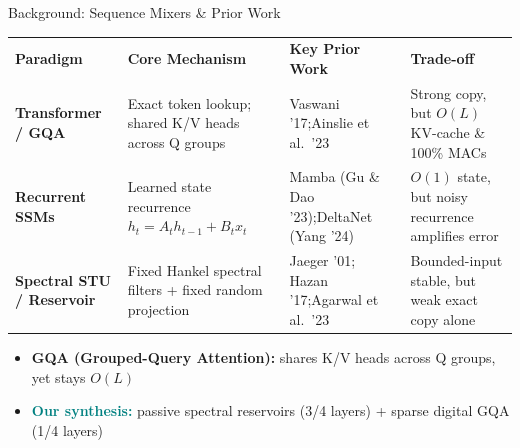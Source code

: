 \documentclass[aspectratio=169,10pt]{beamer}
\newcommand{\accentt}[1]{\textcolor{Teal}{\textbf{#1}}}
\begin{document}
\begin{frame}{Background: Sequence Mixers \& Prior Work}
  \vspace*{0.12cm}
  \begin{center}
  \footnotesize
  \setlength{\tabcolsep}{4.5pt}
  \renewcommand{\arraystretch}{1.38}
  \begin{tabular}{@{}L{2.45cm}L{3.85cm}L{3.10cm}L{3.35cm}@{}}
    \textbf{\color{Teal}Paradigm} & \textbf{\color{Teal}Core Mechanism} & \textbf{\color{Teal}Key Prior Work} & \textbf{\color{Teal}Trade-off} \\
    \midrule
    \textbf{Transformer / GQA} & Exact token lookup; shared K/V heads across Q groups & Vaswani '17;\newline Ainslie et al.\ '23 & Strong copy, but $O(L)$ KV-cache \& 100\% MACs \\
    \midrule
    \textbf{Recurrent SSMs} & Learned state recurrence $h_t = A_t h_{t-1} + B_t x_t$ & Mamba (Gu \& Dao '23);\newline DeltaNet (Yang '24) & $O(1)$ state, but noisy recurrence amplifies error \\
    \midrule
    \textbf{Spectral STU / Reservoir} & Fixed Hankel spectral filters + fixed random projection & Jaeger '01; Hazan '17;\newline Agarwal et al.\ '23 & Bounded-input stable, but weak exact copy alone \\
    \bottomrule
  \end{tabular}
  \end{center}
  \vspace*{0.32cm}
  \begin{itemize}\setlength{\itemsep}{0.48em}
    \item {\normalsize \textbf{GQA (Grouped-Query Attention):} shares K/V heads across Q groups, yet stays $O(L)$}
    \item {\normalsize \accentt{Our synthesis:} passive spectral reservoirs (3/4 layers) + sparse digital GQA (1/4 layers)}
  \end{itemize}
\end{frame}
\end{document}
